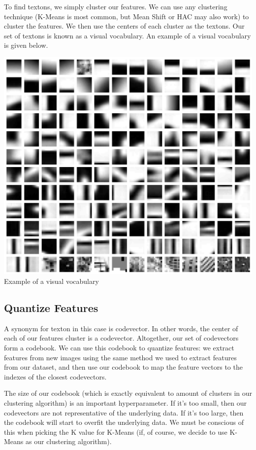\documentclass{article}
\begin{document}
To find textons, we simply cluster our features. We can use any clustering technique (K-Means is most common, but Mean Shift or HAC may also work) to cluster the features. We then use the centers of each cluster as the textons. Our set of textons is known as a visual vocabulary. An example of a visual vocabulary is given below.
\begin{center}
\includegraphics[scale=0.4]{visual_vocab.png}\\
Example of a visual vocabulary \cite{slides}
\end{center}

\subsection{Quantize Features}
A synonym for texton in this case is codevector. In other words, the center of each of our features cluster is a codevector. Altogether, our set of codevectors form a codebook. We can use this codebook to quantize features: we extract features from new images using the same method we used to extract features from our dataset, and then use our codebook to map the feature vectors to the indexes of the closest codevectors.

The size of our codebook (which is exactly equivalent to amount of clusters in our clustering algorithm) is an important hyperparameter. If it's too small, then our codevectors are not representative of the underlying data. If it's too large, then the codebook will start to overfit the underlying data. We must be conscious of this when picking the K value for K-Means (if, of course, we decide to use K-Means as our clustering algorithm).
\end{document}
